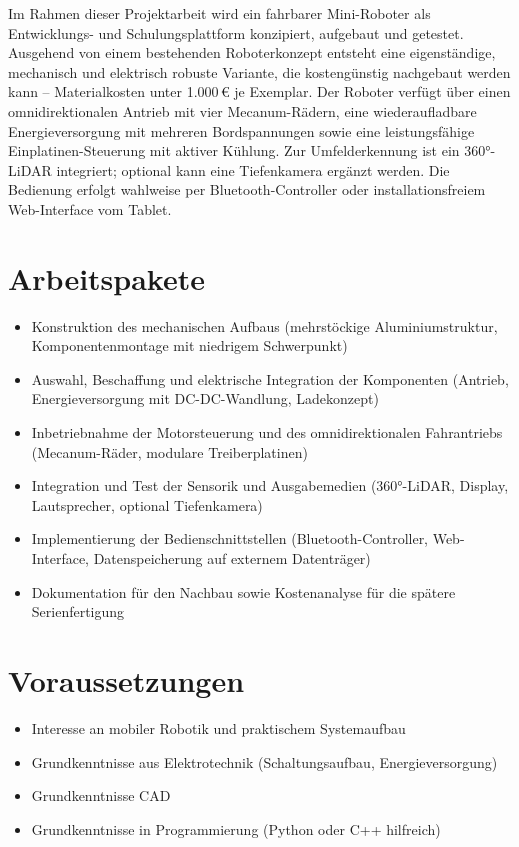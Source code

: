 \documentclass{ohm_project_description}
\begin{document}
\maketitle
\thispagestyle{fancy}

Im Rahmen dieser Projektarbeit wird ein fahrbarer Mini-Roboter als Entwicklungs- und
Schulungsplattform konzipiert, aufgebaut und getestet. Ausgehend von einem bestehenden
Roboterkonzept entsteht eine eigenständige, mechanisch und elektrisch robuste Variante,
die kostengünstig nachgebaut werden kann – Materialkosten unter 1.000\,€ je Exemplar.
Der Roboter verfügt über einen omnidirektionalen Antrieb mit vier Mecanum-Rädern,
eine wiederaufladbare Energieversorgung mit mehreren Bordspannungen sowie eine
leistungsfähige Einplatinen-Steuerung mit aktiver Kühlung. Zur Umfelderkennung ist
ein 360°-LiDAR integriert; optional kann eine Tiefenkamera ergänzt werden. Die
Bedienung erfolgt wahlweise per Bluetooth-Controller oder installationsfreiem
Web-Interface vom Tablet.

\section*{Arbeitspakete}
\begin{itemize}[leftmargin=0.5cm]
    \setlength\itemsep{.1em}
    \item Konstruktion des mechanischen Aufbaus (mehrstöckige Aluminiumstruktur,
          Komponentenmontage mit niedrigem Schwerpunkt)
    \item Auswahl, Beschaffung und elektrische Integration der Komponenten
          (Antrieb, Energieversorgung mit DC-DC-Wandlung, Ladekonzept)
    \item Inbetriebnahme der Motorsteuerung und des omnidirektionalen Fahrantriebs
          (Mecanum-Räder, modulare Treiberplatinen)
    \item Integration und Test der Sensorik und Ausgabemedien (360°-LiDAR, Display,
          Lautsprecher, optional Tiefenkamera)
    \item Implementierung der Bedienschnittstellen (Bluetooth-Controller, Web-Interface,
          Datenspeicherung auf externem Datenträger)
    \item Dokumentation für den Nachbau sowie Kostenanalyse für die spätere
          Serienfertigung
\end{itemize}

\section*{Voraussetzungen}
\begin{itemize}[leftmargin=0.5cm]
    \setlength\itemsep{.1em}
    \item Interesse an mobiler Robotik und praktischem Systemaufbau
    \item Grundkenntnisse aus Elektrotechnik (Schaltungsaufbau, Energieversorgung)
    \item Grundkenntnisse CAD
    \item Grundkenntnisse in Programmierung (Python oder C++ hilfreich)
\end{itemize}
\end{document}
